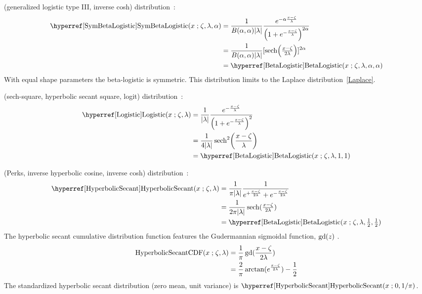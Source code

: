  (generalized logistic type III, inverse cosh) distribution~\cite{Johnson1995}:
\begin{align}
\label{SymBetaLogistic}
\opr{SymBetaLogistic}(x\given \pLoc,\pScale,\alpha) 
& =
\frac{1}{B(\alpha, \alpha) |\pScale|}
 \frac{e^{-\alpha \frac{x-\pLoc}{\pScale} }} { \Left(1 + e^{-\frac{x-\pLoc}{\pScale}  }\Right)^{2\alpha} } \checked
  \\ \notag & = \frac{1}{B(\alpha, \alpha) |\pScale|} [\op{sech} \Left(\tfrac{x-\pLoc}{2\pScale}  \Right)]^{2\alpha}  
\\ \notag & = \opr{BetaLogistic}(x\given \pLoc,\pScale,\alpha,\alpha) \checked
\end{align}
With equal shape parameters the  beta-logistic is symmetric. This distribution limits to the Laplace distribution~\eqref{Laplace}.


 (sech-square, hyperbolic secant square, logit) distribution~\cite{Verhulst1845, Balakrishnan1991, Johnson1995}:
\begin{align}
\label{Logistic}
\opr{Logistic}(x\given \pLoc,\pScale) 
& =
 \frac{1}{ \Left| \pScale\Right|}
 \frac{e^{-\frac{x-\pLoc}{\pScale} }} { \Left(1 + e^{-\frac{x-\pLoc}{\pScale}  }\Right)^{2} }	\checked
 \\ \notag & = \frac{1}{4 |\pScale|} \op{sech}^2 \Left(\frac{x-\pLoc}{\pScale}  \Right)  \checked
 \\ \notag & = \opr{BetaLogistic}(x\given \pLoc,\pScale,1,1)	\checked
\end{align}





 (Perks, inverse hyperbolic cosine, inverse cosh) distribution~\cite{Perks1932,Talacko1956, Johnson1995}:
\begin{align}
\label{HyperbolicSecant}
\opr{HyperbolicSecant}(x\given \pLoc, \pScale) 
& =
\frac{1}{\pi |\pScale|}
 \frac{1}{e^{+\sfrac{x-\pLoc}{2\pScale}} + e^{- \sfrac{x-\pLoc}{2\pScale} }} \checked
 \\ & = \frac{1}{2 \pi  |\pScale|} \op{sech}(\sfrac{x-\pLoc}{2\lambda}) \notag \checked
 \\ \notag & = \opr{BetaLogistic}(x\given  \pLoc, \pScale,\tfrac{1}{2},\tfrac{1}{2}) \checked
\end{align}
The hyperbolic secant cumulative distribution function features the Gudermannian sigmoidal function, $\operatorname{gd}(z)$ . 
\begin{align*}
\operatorname{HyperbolicSecantCDF}(x\mathrel{;} \zeta, \lambda)  & = \frac{1}{\pi}\operatorname{gd}(\frac{x-\zeta}{2 \lambda})  \\
& =  \frac{2}{\pi} \arctan(e^\frac{x-\zeta}{2\lambda}) - \frac{1}{2} 
\end{align*}
The standardized hyperbolic secant distribution (zero mean, unit variance) is $\opr{HyperbolicSecant}(x\given 0, 1/\pi)\checked$.

